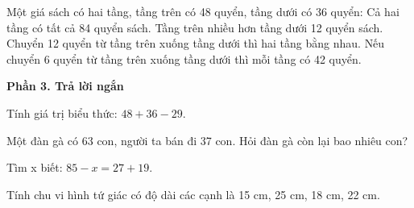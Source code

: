 \begin{ex} %
Một giá sách có hai tầng, tầng trên có 48 quyển, tầng dưới có 36 quyển:
\choiceTF
{\True Cả hai tầng có tất cả 84 quyển sách.}
{\True Tầng trên nhiều hơn tầng dưới 12 quyển sách.}
{Chuyển 12 quyển từ tầng trên xuống tầng dưới thì hai tầng bằng nhau.}
{\True Nếu chuyển 6 quyển từ tầng trên xuống tầng dưới thì mỗi tầng có 42 quyển.}
\end{ex}

\textbf{Phần 3. Trả lời ngắn}

\begin{ex} %
Tính giá trị biểu thức: $48 + 36 - 29$.
\end{ex}

\begin{ex} %
Một đàn gà có 63 con, người ta bán đi 37 con. Hỏi đàn gà còn lại bao nhiêu con?
\end{ex}

\begin{ex} %
Tìm x biết: $85 - x = 27 + 19$.
\end{ex}

\begin{ex} %
Tính chu vi hình tứ giác có độ dài các cạnh là 15 cm, 25 cm, 18 cm, 22 cm.
\end{ex}

